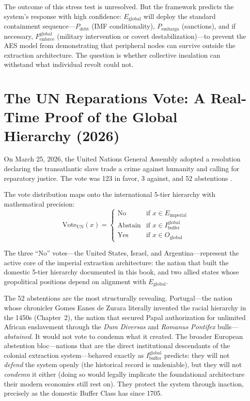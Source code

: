 \documentclass[12pt,openany]{book}
\begin{document}
The outcome of this stress test is unresolved. But the framework predicts the system's response with high confidence: $E_{\text{global}}$ will deploy the standard containment sequence---$P_{\text{debt}}$ (IMF conditionality), $P_{\text{embargo}}$ (sanctions), and if necessary, $F_{\text{enforce}}^{\text{global}}$ (military intervention or covert destabilization)---to prevent the AES model from demonstrating that peripheral nodes can survive outside the extraction architecture. The question is whether collective insulation can withstand what individual revolt could not.

\section{The UN Reparations Vote: A Real-Time Proof of the Global Hierarchy (2026)}

On March 25, 2026, the United Nations General Assembly adopted a resolution declaring the transatlantic slave trade a crime against humanity and calling for reparatory justice. The vote was 123 in favor, 3 against, and 52 abstentions \cite{unreparations2026}.

The vote distribution maps onto the international 5-tier hierarchy with mathematical precision:
\[
\text{Vote}_{\text{UN}}(x) = \begin{cases} \text{No} & \text{if } x \in E_{\text{imperial}} \\[4pt] \text{Abstain} & \text{if } x \in I_{\text{buffer}}^{\text{global}} \\[4pt] \text{Yes} & \text{if } x \in O_{\text{global}} \end{cases}
\]

The three ``No'' votes---the United States, Israel, and Argentina---represent the active core of the imperial extraction architecture: the nation that built the domestic 5-tier hierarchy documented in this book, and two allied states whose geopolitical positions depend on alignment with $E_{\text{global}}$.

The 52 abstentions are the most structurally revealing. Portugal---the nation whose chronicler Gomes Eanes de Zurara literally invented the racial hierarchy in the 1450s (Chapter~2), the nation that secured Papal authorization for unlimited African enslavement through the \textit{Dum Diversas} and \textit{Romanus Pontifex} bulls---\textit{abstained}. It would not vote to condemn what it created. The broader European abstention bloc---nations that are the direct institutional descendants of the colonial extraction system---behaved exactly as $I_{\text{buffer}}^{\text{global}}$ predicts: they will not \textit{defend} the system openly (the historical record is undeniable), but they will not \textit{condemn} it either (doing so would legally implicate the foundational architecture their modern economies still rest on). They protect the system through inaction, precisely as the domestic Buffer Class has since 1705.
\end{document}
